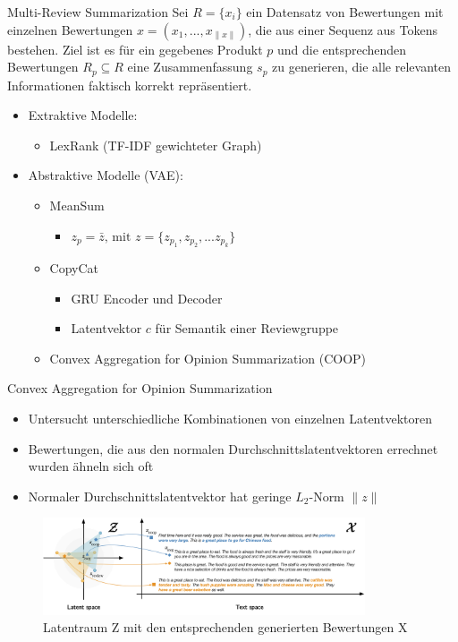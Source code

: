 

\begin{frame}{Multi-Review Summarization}
  Sei $R= \{x_i \}$ ein Datensatz von Bewertungen mit einzelnen Bewertungen $x=(x_1,...,x_{\| x \|})$, die aus einer Sequenz aus Tokens bestehen.
Ziel ist es für ein gegebenes Produkt $p$ und die entsprechenden Bewertungen $R_p \subseteq R$ eine Zusammenfassung $s_p$ zu generieren, die alle relevanten Informationen faktisch korrekt repräsentiert.
\begin{itemize}   
  \item Extraktive Modelle: \begin{itemize}
    \item LexRank (TF-IDF gewichteter Graph)
  \end{itemize}
  \item Abstraktive Modelle (VAE): \begin{itemize}
    \item MeanSum \begin{itemize}
      \item $z_p = \bar{z} \text{, mit } z=\{z_{p_1},z_{p_2},...z_{p_k}\}$
    \end{itemize}
    \item CopyCat \begin{itemize}
      \item GRU Encoder und Decoder
      \item Latentvektor $c$ für Semantik einer Reviewgruppe
    \end{itemize}
    \item Convex Aggregation for Opinion Summarization (COOP)
  \end{itemize}
\end{itemize}
\end{frame}

\begin{frame}{Convex Aggregation for Opinion Summarization}
  \begin{itemize}
    \item Untersucht unterschiedliche Kombinationen von einzelnen Latentvektoren
    \item Bewertungen, die aus den normalen Durchschnittslatentvektoren errechnet wurden ähneln sich oft
    \item Normaler Durchschnittslatentvektor hat geringe $L_2$-Norm $\| z \|$
  \end{itemize}
  \begin{figure}
    \includegraphics[width=0.85\textwidth]{bilder/coop.png}
    \caption{Latentraum Z mit den entsprechenden generierten Bewertungen X}
  \end{figure}
\end{frame}


